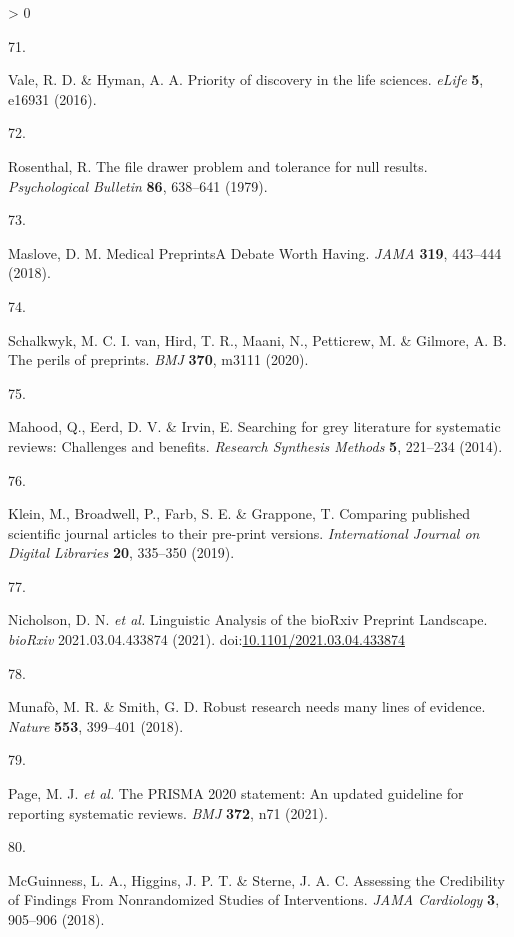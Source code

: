 \documentclass[a4paper, twoside]{templates/ociamthesis}
\newlength{\cslhangindent}
\newlength{\csllabelwidth}
\newenvironment{CSLReferences}[3] %
 {%
  \setlength{\parindent}{0pt}
  \ifodd #1 \everypar{\setlength{\hangindent}{\cslhangindent}}\ignorespaces\fi
  \ifnum #2 > 0
  \setlength{\parskip}{#2\baselineskip}
  \fi
 }%
 {}
\newcommand{\CSLLeftMargin}[1]{\parbox[t]{\maxof{\widthof{#1}}{\csllabelwidth}}{#1}}
\newcommand{\CSLRightInline}[1]{\parbox[t]{\linewidth - \csllabelwidth}{#1}}
\begin{document}
\begin{CSLReferences}{0}{0}
\leavevmode\hypertarget{ref-vale2016}{}%
\CSLLeftMargin{71. }
\CSLRightInline{Vale, R. D. \& Hyman, A. A. Priority of discovery in the life sciences. \emph{eLife} \textbf{5}, e16931 (2016).}

\leavevmode\hypertarget{ref-rosenthal1979}{}%
\CSLLeftMargin{72. }
\CSLRightInline{Rosenthal, R. The file drawer problem and tolerance for null results. \emph{Psychological Bulletin} \textbf{86}, 638--641 (1979).}

\leavevmode\hypertarget{ref-maslove2018}{}%
\CSLLeftMargin{73. }
\CSLRightInline{Maslove, D. M. Medical {Preprints}{{A Debate Worth Having}}. \emph{JAMA} \textbf{319}, 443--444 (2018).}

\leavevmode\hypertarget{ref-schalkwyk2020}{}%
\CSLLeftMargin{74. }
\CSLRightInline{Schalkwyk, M. C. I. van, Hird, T. R., Maani, N., Petticrew, M. \& Gilmore, A. B. The perils of preprints. \emph{BMJ} \textbf{370}, m3111 (2020).}

\leavevmode\hypertarget{ref-mahood2014}{}%
\CSLLeftMargin{75. }
\CSLRightInline{Mahood, Q., Eerd, D. V. \& Irvin, E. Searching for grey literature for systematic reviews: Challenges and benefits. \emph{Research Synthesis Methods} \textbf{5}, 221--234 (2014).}

\leavevmode\hypertarget{ref-klein2019}{}%
\CSLLeftMargin{76. }
\CSLRightInline{Klein, M., Broadwell, P., Farb, S. E. \& Grappone, T. Comparing published scientific journal articles to their pre-print versions. \emph{International Journal on Digital Libraries} \textbf{20}, 335--350 (2019).}

\leavevmode\hypertarget{ref-nicholson2021}{}%
\CSLLeftMargin{77. }
\CSLRightInline{Nicholson, D. N. \emph{et al.} Linguistic {Analysis} of the {bioRxiv Preprint Landscape}. \emph{bioRxiv} 2021.03.04.433874 (2021). doi:\href{https://doi.org/10.1101/2021.03.04.433874}{10.1101/2021.03.04.433874}}

\leavevmode\hypertarget{ref-munafo2018}{}%
\CSLLeftMargin{78. }
\CSLRightInline{Munafò, M. R. \& Smith, G. D. Robust research needs many lines of evidence. \emph{Nature} \textbf{553}, 399--401 (2018).}

\leavevmode\hypertarget{ref-page2021}{}%
\CSLLeftMargin{79. }
\CSLRightInline{Page, M. J. \emph{et al.} The {PRISMA} 2020 statement: An updated guideline for reporting systematic reviews. \emph{BMJ} \textbf{372}, n71 (2021).}

\leavevmode\hypertarget{ref-mcguinness2018}{}%
\CSLLeftMargin{80. }
\CSLRightInline{McGuinness, L. A., Higgins, J. P. T. \& Sterne, J. A. C. Assessing the {Credibility} of {Findings From Nonrandomized Studies} of {Interventions}. \emph{JAMA Cardiology} \textbf{3}, 905--906 (2018).}


\end{CSLReferences}
\end{document}
